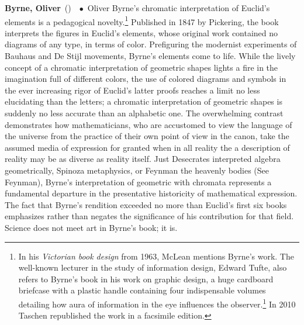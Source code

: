 \documentclass[10pt,a4paper,twoside]{article} %
\newcommand{\entry}[4]{\markboth{#1}{#1}\textbf{#1}\ {(#2)}\ \textit{#3}\ $\bullet$\ {#4}}  %
\begin{document}
\begin{multicols}{2}
\entry{Byrne, Oliver} {} {} {Oliver Byrne's chromatic interpretation of Euclid's elements is a pedagogical novelty.\footnote{In his \emph{Victorian book design} from 1963, McLean mentions Byrne's work. The well-known lecturer in the study of information design, Edward Tufte, also refers to Byrne's book in his work on graphic design, a huge cardboard briefcase with a plastic handle containing four indispensable volumes detailing how aura of information in the eye influences the observer.\footnote{These titles represent a high watermark in the history of the data representation: \emph{Beautiful Evidence}, \emph{Visual Explanations}, \emph{Envisioning Information}, \emph{The Visual Display of Quantative Information}. In many of these books are graphics famous not only in the history of statistics but in history in general. \emph{The Visual Display of Quantitative Information}, for instance, displays a sight to behold: Charles Joseph Minard's time-series graph with space detailing Napoleon's devastating losses overtime but pegged to the respective dates of his 1812 campaign for an invasion of Russia with a special emphasis on Napoleon's river crossings. Tufte explains how the graphic "seeming to defy the pen of the historian by its brutal eloquence" combines "data-map and time-series." A brown bar displays Napoleon's invasion; below a black bar displays his retreat. It tells "a rich, coherent story with its multivariate data, far more enlightening than just a single number bouncing along over time." On the black bar "the crossing of the Berezina River was a disaster" with Napoleon losing more than 24,000 men, an enormous amount for a retreat nearly one river crossing from safety. (2001; pg. 40) Tufte claims Minard's graphic may well be the best statistical graphic ever drawn.} In 2010 Taschen republished the work in a facsimile edition.} Published in 1847 by Pickering, the book interprets the figures in Euclid's elements, whose original work contained no diagrams of any type, in terms of color. Prefiguring the modernist experiments of Bauhaus and De Stijl movements, Byrne's elements come to life. While the lively concept of a chromatic interpretation of geometric shapes lights a fire in the imagination full of different colors, the use of colored diagrams and symbols in the ever increasing rigor of Euclid's latter proofs reaches a limit no less elucidating than the letters; a chromatic interpretation of geometric shapes is suddenly no less accurate than an alphabetic one. The overwhelming contrast demonstrates how mathematicians, who are accustomed to view the language of the universe from the practice of their own point of view in the canon, take the assumed media of expression for granted when in all reality the a description of reality may be as diverse as reality itself. Just Desecrates interpreted algebra geometrically, Spinoza metaphysics, or Feynman the heavenly bodies (See Feynman), Byrne's interpretation of geometric with chromata represents a fundamental departure in the presentative historicity of mathematical expression. The fact that Byrne's rendition exceeded no more than Euclid's first six books emphasizes rather than negates the significance of his contribution for that field. Science does not meet art in Byrne's book; it is.}


\end{multicols}
\end{document}
